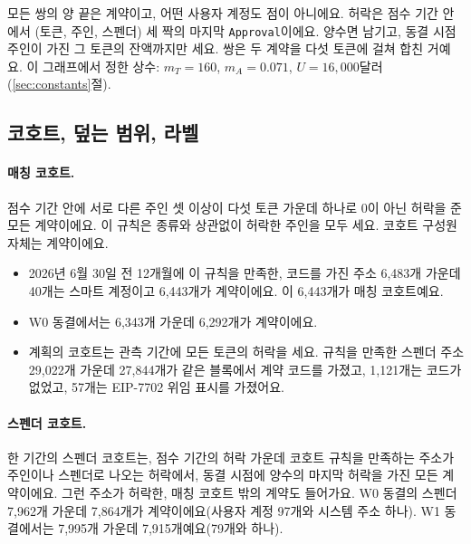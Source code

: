 \begin{table}[!ht]
\vspace{4pt}
\parbox{0.85\linewidth}{\footnotesize 모든 쌍의 양 끝은 계약이고, 어떤 사용자 계정도 점이 아니에요. 허락은 점수 기간 안에서 (토큰, 주인, 스펜더) 세 짝의 마지막 \texttt{Approval}이에요. 양수면 남기고, 동결 시점 주인이 가진 그 토큰의 잔액까지만 세요. 쌍은 두 계약을 다섯 토큰에 걸쳐 합친 거예요. 이 그래프에서 정한 상수: $m_T=160$, $m_A=0.071$, $U=16{,}000$달러(\ref{sec:constants}절).}
\end{table}

\subsection{코호트, 덮는 범위, 라벨}
\label{sec:cohorts}

\paragraph{매칭 코호트.}
점수 기간 안에 서로 다른 주인 셋 이상이 다섯 토큰 가운데 하나로 0이 아닌 허락을 준 모든 계약이에요. 이 규칙은 종류와 상관없이 허락한 주인을 모두 세요. 코호트 구성원 자체는 계약이에요.
\begin{itemize}
\item 2026년 6월 30일 전 12개월에 이 규칙을 만족한, 코드를 가진 주소 6,483개 가운데 40개는 스마트 계정이고 6,443개가 계약이에요. 이 6,443개가 매칭 코호트예요.
\item W0 동결에서는 6,343개 가운데 6,292개가 계약이에요.
\item 계획의 코호트는 관측 기간에 모든 토큰의 허락을 세요. 규칙을 만족한 스펜더 주소 29,022개 가운데 27,844개가 같은 블록에서 계약 코드를 가졌고, 1,121개는 코드가 없었고, 57개는 EIP-7702 위임 표시를 가졌어요.
\end{itemize}

\paragraph{스펜더 코호트.}
한 기간의 스펜더 코호트는, 점수 기간의 허락 가운데 코호트 규칙을 만족하는 주소가 주인이나 스펜더로 나오는 허락에서, 동결 시점에 양수의 마지막 허락을 가진 모든 계약이에요. 그런 주소가 허락한, 매칭 코호트 밖의 계약도 들어가요. W0 동결의 스펜더 7,962개 가운데 7,864개가 계약이에요(사용자 계정 97개와 시스템 주소 하나). W1 동결에서는 7,995개 가운데 7,915개예요(79개와 하나).

